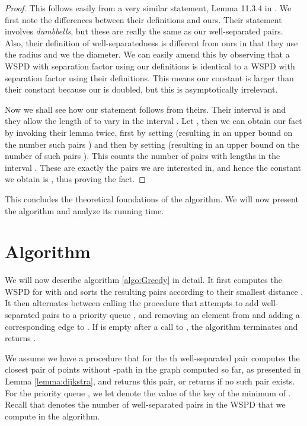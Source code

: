 \documentclass[runningheads,envcountsame,oribibl,orivec]{llncs}
\begin{document}
\begin{proof}
This follows easily from a very similar statement, Lemma 11.3.4 in \cite{Narasimhan:2007:GSN:1208237}. We first note the differences between their definitions and ours. Their statement involves \emph{dumbbells}, but these are really the same as our well-separated pairs. Also, their definition of well-separatedness is different from ours in that they use the radius and we the diameter. We can easily amend this by observing that a WSPD with separation factor  using our definitions is identical to a WSPD with separation factor  using their definitions. This means our constant  is larger than their constant because our  is doubled, but this is asymptotically irrelevant.

Now we shall see how our statement follows from theirs. Their interval is  and they allow the length of  to vary in the interval . Let , then we can obtain our fact by invoking their lemma twice, first by setting  (resulting in an upper bound on the number such pairs ) and then by setting  (resulting in an upper bound on the number of such pairs ). This counts the number of pairs with lengths in the interval . These are exactly the pairs we are interested in, and hence the constant we obtain is , thus proving the fact.
\end{proof}

This concludes the theoretical foundations of the algorithm. We will now present the algorithm and analyze its running time.

\section{Algorithm} \label{section:algorithm}

We will now describe algorithm \ref{algo:Greedy} in detail. It first computes the WSPD for  with  and sorts the resulting pairs according to their smallest distance . It then alternates between calling the  procedure that attempts to add well-separated pairs to a priority queue , and removing an element from  and adding a corresponding edge to . If  is empty after a call to , the algorithm terminates and returns .

We assume we have a procedure  that for the th well-separated pair computes the closest pair of points without -path in the graph computed so far, as presented in Lemma \ref{lemma:dijkstra}, and returns this pair, or returns \qnil if no such pair exists. For the priority queue , we let  denote the value of the key of the minimum of . Recall that  denotes the number of well-separated pairs in the WSPD that we compute in the algorithm.
\end{document}
